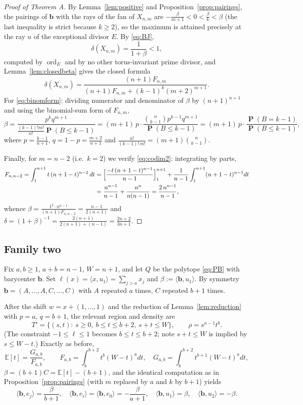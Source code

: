 \documentclass[11pt]{amsart}
\theoremstyle{definition}
\theoremstyle{remark}
\newcommand{\ord}{\operatorname{ord}}
\newcommand{\pr}{\operatorname{\mathbf{P}}}
\begin{document}
\begin{proof}[Proof of Theorem A]
By Lemma~\ref{lem:positive} and
Proposition~\ref{prop:pairings}, the pairings of $\mathbf b$ with the
rays of the fan of $X_{n,m}$ are
$-\tfrac{\beta}{m+1}<0<\tfrac{\beta}{k}<\beta$ (the last inequality is
strict because $k\ge2$), so the maximum is attained precisely at the
ray $u$ of the exceptional divisor $E$. By \eqref{eq:BJ},
\[
\delta(X_{n,m})=\frac{1}{1+\beta}<1,
\]
computed by $\ord_E$ and by no other torus-invariant prime divisor,
and Lemma~\ref{lem:closedbeta} gives the closed formula
\[
\delta(X_{n,m})
=\frac{(n+1)F_{n,m}}{(n+1)F_{n,m}+(k-1)^{k}(m+2)^{m+1}} .
\]
For \eqref{eq:binomform}: dividing numerator and denominator of
$\beta$ by $(n+1)^{n+1}$ and using the binomial-sum form of $F_{n,m}$,
\[
\beta
=\frac{p^{k}q^{m+1}}{\frac{(k-1)!m!}{n!}\pr(B\le k-1)}
=(m+1)\,p\cdot\frac{\binom{n}{k-1}p^{k-1}q^{m+1}}{\pr(B\le k-1)}
=(m+1)\,p\cdot\frac{\pr(B=k-1)}{\pr(B\le k-1)},
\]
where $p=\tfrac{k-1}{n+1}$, $q=1-p=\tfrac{m+2}{n+1}$ and
$\tfrac{n!}{(k-1)!\,m!}=(m+1)\binom{n}{k-1}$.

Finally, for $m=n-2$ (i.e.\ $k=2$) we verify \eqref{eq:codim2}:
integrating by parts,
\begin{align*}
F_{n,n-2}=\int_{1}^{n+1}t\,(n+1-t)^{n-2}\,dt
&=\Bigl[\frac{-t\,(n+1-t)^{n-1}}{n-1}\Bigr]_1^{n+1}
+\frac{1}{n-1}\int_1^{n+1}(n+1-t)^{n-1}dt\\
&=\frac{n^{n-1}}{n-1}+\frac{n^{n}}{n(n-1)}
=\frac{2\,n^{n-1}}{n-1},
\end{align*}
whence
$\beta=\frac{1^2\cdot n^{n-1}}{(n+1)F_{n,n-2}}=\frac{n-1}{2(n+1)}$ and
$\delta=(1+\beta)^{-1}
=\frac{2(n+1)}{2(n+1)+(n-1)}=\frac{2n+2}{3n+1}$.
\end{proof}

\subsection{Family two}\label{subsec:proofB}

Fix $a,b\ge1$, $a+b=n-1$, $W=n+1$, and let $Q$ be the polytope
\eqref{eq:PB} with barycenter $\mathbf b$. Set
$\ell(x)=\langle x,u_1\rangle=\sum_{j>a}x_j$ and
$\beta:=\langle\mathbf b,u_1\rangle$. By symmetry
$\mathbf b=(A,\dots,A,C,\dots,C)$ with $A$ repeated $a$ times, $C$
repeated $b+1$ times.

After the shift $w=x+(1,\dots,1)$ and the reduction of
Lemma~\ref{lem:reduction} with $p=a$, $q=b+1$, the relevant region and
density are
\[
T'=\{(s,t):\ s\ge0,\ b\le t\le b+2,\ s+t\le W\},
\qquad \rho=s^{a-1}t^{b} .
\]
(The constraint $-1\le\ell\le1$ becomes $b\le t\le b+2$; note
$s+t\le W$ is implied by $s\le W-t$.) Exactly as before,
\[
\mathbb E[t]=\frac{G_{a,b}}{F_{a,b}},\qquad
F_{a,b}=\int_b^{b+2}t^{b}(W-t)^{a}dt,\quad
G_{a,b}=\int_b^{b+2}t^{b+1}(W-t)^{a}dt,
\]
$\beta=(b+1)C=\mathbb E[t]-(b+1)$, and the identical computation as in
Proposition~\ref{prop:pairings} (with $m$ replaced by $a$ and $k$ by
$b+1$) yields
\begin{equation}\label{eq:pairingsB}
\langle\mathbf b,e_j\rangle=\frac{\beta}{b+1},\quad
\langle\mathbf b,e_i\rangle=\langle\mathbf b,e_0\rangle
=-\frac{\beta}{a+1},\quad
\langle\mathbf b,u_1\rangle=\beta,\quad
\langle\mathbf b,u_2\rangle=-\beta .
\end{equation}
\end{document}
